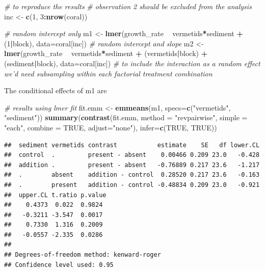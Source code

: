 \documentclass[]{book}
\newenvironment{Shaded}{\begin{snugshade}}{\end{snugshade}}
\newcommand{\CommentTok}[1]{\textcolor[rgb]{0.56,0.35,0.01}{\textit{#1}}}
\newcommand{\DataTypeTok}[1]{\textcolor[rgb]{0.13,0.29,0.53}{#1}}
\newcommand{\DecValTok}[1]{\textcolor[rgb]{0.00,0.00,0.81}{#1}}
\newcommand{\KeywordTok}[1]{\textcolor[rgb]{0.13,0.29,0.53}{\textbf{#1}}}
\newcommand{\NormalTok}[1]{#1}
\newcommand{\OperatorTok}[1]{\textcolor[rgb]{0.81,0.36,0.00}{\textbf{#1}}}
\newcommand{\OtherTok}[1]{\textcolor[rgb]{0.56,0.35,0.01}{#1}}
\newcommand{\StringTok}[1]{\textcolor[rgb]{0.31,0.60,0.02}{#1}}
\begin{document}
\begin{Shaded}
\begin{Highlighting}[]
\CommentTok{# to reproduce the results}
\CommentTok{# observation 2 should be excluded from the analysis}
\NormalTok{inc <-}\StringTok{ }\KeywordTok{c}\NormalTok{(}\DecValTok{1}\NormalTok{, }\DecValTok{3}\OperatorTok{:}\KeywordTok{nrow}\NormalTok{(coral))}

\CommentTok{# random intercept only}
\NormalTok{m1 <-}\StringTok{ }\KeywordTok{lmer}\NormalTok{(growth_rate }\OperatorTok{~}\StringTok{ }\NormalTok{vermetids}\OperatorTok{*}\NormalTok{sediment }\OperatorTok{+}\StringTok{ }\NormalTok{(}\DecValTok{1}\OperatorTok{|}\NormalTok{block), }\DataTypeTok{data=}\NormalTok{coral[inc])}
\CommentTok{# random intercept and slope}
\NormalTok{m2 <-}\StringTok{ }\KeywordTok{lmer}\NormalTok{(growth_rate }\OperatorTok{~}\StringTok{ }\NormalTok{vermetids}\OperatorTok{*}\NormalTok{sediment }\OperatorTok{+}\StringTok{ }\NormalTok{(vermetids}\OperatorTok{|}\NormalTok{block) }\OperatorTok{+}\StringTok{ }\NormalTok{(sediment}\OperatorTok{|}\NormalTok{block), }\DataTypeTok{data=}\NormalTok{coral[inc])}
\CommentTok{# to include the interaction as a random effect we'd need subsampling within each factorial treatment combination}
\end{Highlighting}
\end{Shaded}

The conditional effects of m1 are

\begin{Shaded}
\begin{Highlighting}[]
\CommentTok{# results using lmer fit}
\NormalTok{fit.emm <-}\StringTok{ }\KeywordTok{emmeans}\NormalTok{(m1, }\DataTypeTok{specs=}\KeywordTok{c}\NormalTok{(}\StringTok{"vermetids"}\NormalTok{, }\StringTok{"sediment"}\NormalTok{))}
\KeywordTok{summary}\NormalTok{(}\KeywordTok{contrast}\NormalTok{(fit.emm, }
                 \DataTypeTok{method =} \StringTok{"revpairwise"}\NormalTok{, }
                 \DataTypeTok{simple =} \StringTok{"each"}\NormalTok{,}
                 \DataTypeTok{combine =} \OtherTok{TRUE}\NormalTok{,}
                 \DataTypeTok{adjust=}\StringTok{"none"}\NormalTok{),}
        \DataTypeTok{infer=}\KeywordTok{c}\NormalTok{(}\OtherTok{TRUE}\NormalTok{, }\OtherTok{TRUE}\NormalTok{))}
\end{Highlighting}
\end{Shaded}

\begin{verbatim}
##  sediment vermetids contrast           estimate    SE   df lower.CL
##  control  .         present - absent    0.00466 0.209 23.0   -0.428
##  addition .         present - absent   -0.76889 0.217 23.6   -1.217
##  .        absent    addition - control  0.28520 0.217 23.6   -0.163
##  .        present   addition - control -0.48834 0.209 23.0   -0.921
##  upper.CL t.ratio p.value
##    0.4373  0.022  0.9824 
##   -0.3211 -3.547  0.0017 
##    0.7330  1.316  0.2009 
##   -0.0557 -2.335  0.0286 
## 
## Degrees-of-freedom method: kenward-roger 
## Confidence level used: 0.95
\end{verbatim}
\end{document}
